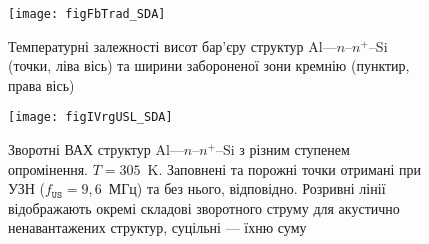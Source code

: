 \begin{figure}[b]
\center
\texttt{[image: figFbTrad\_SDA]}
\caption{\label{figFbTrad_SDA}
Температурні залежності висот бар'єру структур Al---$n$--$n^+$--Si (точки, ліва вісь) та
ширини забороненої зони кремнію (пунктир, права вісь)
}%
\end{figure}




%


\begin{SCfigure}
\texttt{[image: figIVrgUSL\_SDA]}
\caption{\label{figIVrg0USL_SDA}
Зворотні  ВАХ  структур Al---$n$--$n^+$--Si з різним ступенем опромінення.
$T=305$~K.
Заповнені та порожні точки отримані при УЗН ($f_\mathtt{US}=9,6$~МГц) та без нього, відповідно.
Розривні лінії відображають окремі складові зворотного струму для акустично ненавантажених структур,
суцільні --- їхню суму
}
\end{SCfigure}

